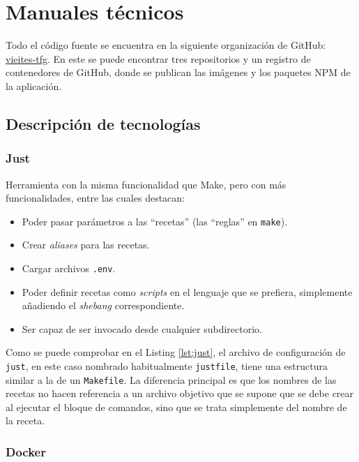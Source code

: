 \chapter{Manuales técnicos}

Todo el código fuente se encuentra en la siguiente organización de GitHub: \href{https://github.com/vieites-tfg}{vieites-tfg}. En este se puede encontrar tres repositorios y un registro de contenedores de GitHub, donde se publican las imágenes y los paquetes NPM de la aplicación.

\section{Descripción de tecnologías}
\label{sec:tech-desc}

\subsection*{Just}
\label{tech:just}

Herramienta con la misma funcionalidad que Make, pero con más funcionalidades, entre las cuales destacan:

\begin{itemize}
  \item Poder pasar parámetros a las ``recetas'' (las ``reglas'' en \texttt{make}).
  \item Crear \textit{aliases} para las recetas.
  \item Cargar archivos \texttt{.env}.
  \item Poder definir recetas como \textit{scripts} en el lenguaje que se prefiera, simplemente añadiendo el \textit{shebang}\cite{shebang} correspondiente.
  \item Ser capaz de ser invocado desde cualquier subdirectorio.
\end{itemize}

Como se puede comprobar en el Listing \ref{lst:just}, el archivo de configuración de \texttt{just}, en este caso nombrado habitualmente \texttt{justfile}, tiene una estructura similar a la de un \texttt{Makefile}. La diferencia principal es que los nombres de las recetas no hacen referencia a un archivo objetivo que se supone que se debe crear al ejecutar el bloque de comandos, sino que se trata simplemente del nombre de la receta.

\subsection*{Docker}
\label{tech:docker}

